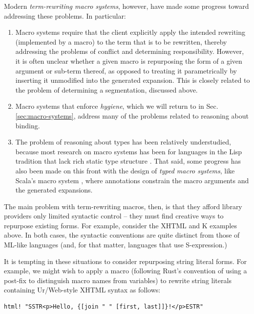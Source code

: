 Modern \emph{term-rewriting macro systems}, however, have made some progress toward addressing these problems. In particular:
\begin{enumerate}
\item Macro systems require that the client explicitly apply the intended rewriting (implemented by a macro) to the term that is to be rewritten, thereby addressing the problems of conflict and determining responsibility. However, it is often unclear whether a given macro  is repurposing the form of a given argument or sub-term thereof, as opposed to treating it parametrically by inserting it unmodified into the generated expansion. This is closely related to the problem of determining a {segmentation}, discussed above.
\item Macro systems that enforce \emph{hygiene}, which we will return to in Sec. \ref{sec:macro-systems}, address many of the problems related to reasoning about binding. 
\item The problem of reasoning about types has been relatively understudied, because most research on macro systems has been for languages in the Lisp tradition that lack rich static type structure \cite{mccarthy1978history}. That said, some progress has also been made on this front with the design of \emph{typed macro systems}, like Scala's macro system \cite{ScalaMacros2013}, where annotations constrain the macro arguments and the generated expansions.
\end{enumerate}

The main problem with term-rewriting macros, then, is that they afford library providers only limited syntactic control -- they must find creative ways to repurpose existing forms. For example, consider the  XHTML and K examples above. In both cases, the syntactic conventions are quite distinct from those of ML-like languages (and, for that matter, languages that use S-expression.) %

It is tempting in these situations to consider repurposing string literal forms. For example, we might wish to apply a macro  (following Rust's convention of using a post-fix \li{!} to distinguish macro names from variables) to rewrite string literals containing Ur/Web-style XHTML syntax as follows:
\begin{lstlisting}[numbers=none]
  html! "SSTR<p>Hello, {[join " " [first, last]]}!</p>ESTR"
\end{lstlisting}

